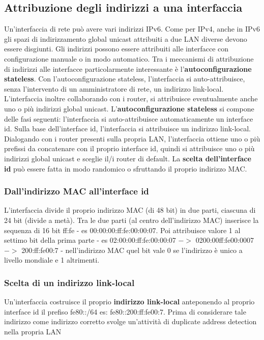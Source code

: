 \documentclass{article}
\begin{document}
\subsection{Attribuzione degli indirizzi a una interfaccia}
Un'interfaccia di rete può avere vari indirizzi IPv6. Come per IPv4, anche in IPv6 gli spazi di indirizzamento global unicast attribuiti a due LAN diverse devono essere disgiunti. Gli indirizzi possono essere attribuiti alle interfacce con configurazione manuale o in modo automatico. Tra i meccanismi di attribuzione di indirizzi alle interfacce particolarmente interessante è l'\textbf{autoconfigurazione stateless}. Con l'autoconfigurazione stateless, l'interfaccia si auto-attribuisce, senza l'intervento di un amministratore di rete, un indirizzo link-local. L'interfaccia inoltre collaborando con i router, si attribuisce eventualmente anche uno o più indirizzi global unicast. L'\textbf{autoconfigurazione stateless} si compone delle fasi seguenti: l'interfaccia si auto-attribuisce automaticamente un interface id. Sulla base dell'interface id, l'interfaccia si attribuisce un indirizzo link-local. Dialogando con i router presenti sulla propria LAN, l'interfaccia ottiene uno o più prefissi da concatenare con il proprio interface id, quindi si attribuisce uno o più indirizzi global unicast e sceglie il/i router di default. La \textbf{scelta dell'interface id} può essere fatta in modo randomico o sfruttando il proprio indirizzo MAC. 
\subsubsection{Dall'indirizzo MAC all'interface id}
L'interfaccia divide il proprio indirizzo MAC (di 48 bit) in due parti, ciascuna di 24 bit (divide a metà). Tra le due parti (al centro dell'indirizzo MAC) inserisce la sequenza di 16 bit ff:fe - es 00:00:00:ff:fe:00:00:07. Poi attribuisce valore 1 al settimo bit della prima parte - es 02:00:00:ff:fe:00:00:07 $->$ 0200:00ff:fe00:0007 $->$ 200:ff:fe00:7 - nell'indirizzo MAC quel bit vale 0 se l'indirizzo è unico a livello mondiale e 1 altrimenti.
\subsubsection{Scelta di un indirizzo link-local}
Un'interfaccia costruisce il proprio \textbf{indirizzo link-local} anteponendo al proprio interface id il prefiso fe80::/64 es: fe80::200:ff:fe00:7. Prima di considerare tale indirizzo come indirizzo corretto svolge un'attività di duplicate address detection nella propria LAN
\end{document}
